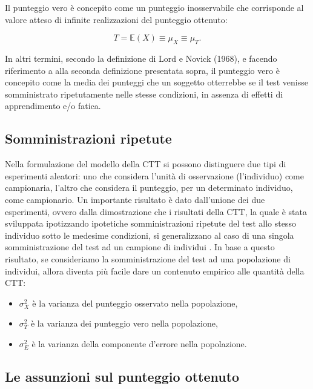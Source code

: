 \documentclass[
  11pt,
]{krantz}
\providecommand{\tightlist}{%
  \setlength{\itemsep}{0pt}\setlength{\parskip}{0pt}}
\newcommand{\E}{\mathbb{E}} %
\theoremstyle{definition}
\theoremstyle{definition}
\theoremstyle{definition}
\theoremstyle{definition}
\theoremstyle{remark}
\begin{document}
Il punteggio vero è concepito come un punteggio inosservabile che corrisponde al valore atteso di infinite realizzazioni del punteggio ottenuto:

\[
T = \E(X) \equiv \mu_X \equiv \mu_{T}.
\]

In altri termini, secondo la definizione di Lord e Novick (1968), e facendo riferimento a alla seconda definizione presentata sopra, il punteggio vero è concepito come la media dei punteggi che un soggetto otterrebbe se il test venisse somministrato ripetutamente nelle stesse condizioni, in assenza di effetti di apprendimento e/o fatica.

\hypertarget{somministrazioni-ripetute}{%
\subsection{Somministrazioni ripetute}\label{somministrazioni-ripetute}}

Nella formulazione del modello della CTT si possono distinguere due tipi di esperimenti aleatori: uno che considera l'unità di osservazione (l'individuo) come campionaria, l'altro che considera il punteggio, per un determinato individuo, come campionario. Un importante risultato è dato dall'unione dei due esperimenti, ovvero dalla dimostrazione che i risultati della CTT, la quale è stata sviluppata ipotizzando ipotetiche somministrazioni ripetute del test allo stesso individuo sotto le medesime condizioni, si generalizzano al caso di una singola somministrazione del test ad un campione di individui \citep{allen2001introduction}. In base a questo risultato, se consideriamo la somministrazione del test ad una popolazione di individui, allora diventa più facile dare un contenuto empirico alle quantità della CTT:

\begin{itemize}
\tightlist
\item
  \(\sigma^2_X\) è la varianza del punteggio osservato nella popolazione,
\item
  \(\sigma^2_T\) è la varianza dei punteggio vero nella popolazione,
\item
  \(\sigma^2_E\) è la varianza della componente d'errore nella popolazione.
\end{itemize}

\hypertarget{le-assunzioni-sul-punteggio-ottenuto}{%
\subsection{Le assunzioni sul punteggio ottenuto}\label{le-assunzioni-sul-punteggio-ottenuto}}
\end{document}
